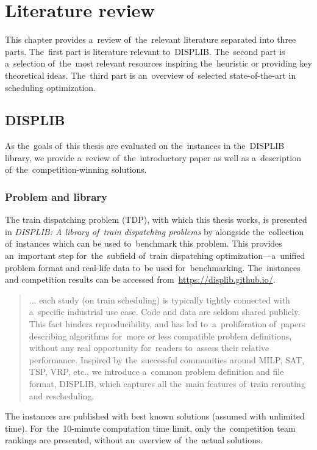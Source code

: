 \chapter{Literature review}
\label{chap:lit_rev}

This chapter provides a~review of~the~relevant literature separated into three parts. The~first part is literature relevant to~DISPLIB. The~second part is a~selection of~the~most relevant resources inspiring the~heuristic or providing key theoretical ideas. The~third part is an~overview of~selected state-of-the-art in scheduling optimization.

\section{DISPLIB}

As the~goals of~this thesis are evaluated on the~instances in the~DISPLIB library, we provide a~review of~the~introductory paper as well as a~description of~the~competition-winning solutions.

\subsection{Problem and library}
The train dispatching problem (TDP), with which this thesis works, is presented in \emph{{DISPLIB}: A library of~train dispatching problems } by \textcite{kloster2025displiblibrarytraindispatching} alongside the~collection of~instances which can be used to~benchmark this problem. This provides an~important step for~the~subfield of~train dispatching optimization---a~unified problem format and real-life data to~be used for~benchmarking. The~instances and competition results can be accessed from~\url{https://displib.github.io/}.

\blockcquote{kloster2025displiblibrarytraindispatching}{
	... each study (on train scheduling) is typically tightly connected with a~specific industrial use case. Code and data are seldom shared publicly. This fact hinders reproducibility, and has led to~a~proliferation of~papers describing algorithms for~more or less compatible problem definitions, without any real opportunity for~readers to~assess their relative performance. Inspired by the~successful communities around MILP, SAT, TSP, VRP, etc., we introduce a~common problem definition and file format, DISPLIB, which captures all the~main	features of~train rerouting and rescheduling.
}

The instances are published with best known solutions (assumed with unlimited time). For~the~10-minute computation time limit, only the~competition team rankings are presented, without an~overview of~the~actual solutions.

